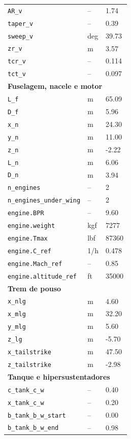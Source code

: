 \begin{longtable}{lll}
\texttt{AR\_v} & -- & 1.74 \\
\texttt{taper\_v} & -- & 0.39 \\
\texttt{sweep\_v} & deg & 39.73 \\
\texttt{zr\_v} & m & 3.57 \\
\texttt{tcr\_v} & -- & 0.114 \\
\texttt{tct\_v} & -- & 0.097 \\
\midrule
\multicolumn{3}{l}{\textbf{Fuselagem, nacele e motor}} \\
\midrule
\texttt{L\_f} & m & 65.09 \\
\texttt{D\_f} & m & 5.96 \\
\texttt{x\_n} & m & 24.30 \\
\texttt{y\_n} & m & 11.00 \\
\texttt{z\_n} & m & -2.22 \\
\texttt{L\_n} & m & 6.06 \\
\texttt{D\_n} & m & 3.94 \\
\texttt{n\_engines} & -- & 2 \\
\texttt{n\_engines\_under\_wing} & -- & 2 \\
\texttt{engine.BPR} & -- & 9.60 \\
\texttt{engine.weight} & kgf & 7277 \\
\texttt{engine.Tmax} & lbf & 87360 \\
\texttt{engine.C\_ref} & 1/h & 0.478 \\
\texttt{engine.Mach\_ref} & -- & 0.85 \\
\texttt{engine.altitude\_ref} & ft & 35000 \\
\midrule
\multicolumn{3}{l}{\textbf{Trem de pouso}} \\
\midrule
\texttt{x\_nlg} & m & 4.60 \\
\texttt{x\_mlg} & m & 32.20 \\
\texttt{y\_mlg} & m & 5.60 \\
\texttt{z\_lg} & m & -5.70 \\
\texttt{x\_tailstrike} & m & 47.50 \\
\texttt{z\_tailstrike} & m & -2.98 \\
\midrule
\multicolumn{3}{l}{\textbf{Tanque e hipersustentadores}} \\
\midrule
\texttt{c\_tank\_c\_w} & -- & 0.40 \\
\texttt{x\_tank\_c\_w} & -- & 0.20 \\
\texttt{b\_tank\_b\_w\_start} & -- & 0.00 \\
\texttt{b\_tank\_b\_w\_end} & -- & 0.98 \\

\end{longtable}

